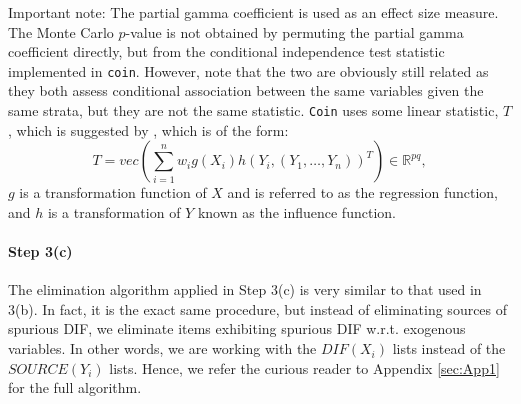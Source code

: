 \documentclass[a4project,12pt]{article}
\theoremstyle{examplestyle}
\theoremstyle{defstyle}
\theoremstyle{thmstyle}
\begin{document}
Important note: The partial gamma coefficient is used as an effect size measure. The
Monte Carlo $p$-value is not obtained by permuting the partial gamma coefficient directly, but from the conditional independence test statistic implemented in \texttt{coin}. However, note that the two are obviously still related as they both assess conditional association between the same variables given the same strata, but they are not the same statistic. \texttt{Coin} uses some linear statistic, $T$, which is suggested by \cite{strasser1999asymptotic}, which is of the form:
\begin{equation}
    T= vec\left( 
    \sum_{i=1}^nw_ig(X_i)h(Y_i,(Y_1,\dots,Y_n))^T
    \right) \in \mathbb{R}^{pq},
\end{equation}
$g$ is a transformation function of $X$ and is referred to as the regression function, and $h$ is a transformation of $Y$ known as the influence function.


\newpage


\paragraph{Step 3(c)} The elimination algorithm applied in Step 3(c) is very similar to that used in 3(b). In fact, it is the exact same procedure, but instead of eliminating sources of spurious DIF, we eliminate items exhibiting spurious DIF w.r.t. exogenous variables. In other words, we are working with the $DIF(X_i)$ lists instead of the $SOURCE(Y_i)$ lists. Hence, we refer the curious reader to Appendix \ref{sec:App1} for the full algorithm. 
\end{document}
